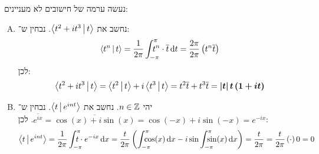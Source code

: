 \documentclass[]{../../../../tex/classes/homework}
\begin{document}
	\section{}
	נעשה ערמה של חישובים לא מעניינים: 
	\begin{enumerate}[(A)]
		\item נחשב את $\left \langle t^{2} + it^{3} \,\middle|\, t \right \rangle$. 
		נבחין ש־: 
		\[ \left \langle t^{n} \,\middle|\, t \right \rangle = \frac{1}{2\pi}\int^{\pi}_{-\pi}\!\!\!\!\!\! t^{n} \cdot\overline{t}\,\mathrm{d}t = \frac{2\pi}{2\pi}\left ( t^{n}\overline{t} \right ) \]
		לכן: 
		\[ \left \langle t^{2} + it^{3} \,\middle|\, t \right \rangle = \left \langle t^{2} \,\middle|\, t \right \rangle + i\left \langle t^{3} \,\middle|\, t \right \rangle = t^{2}\overline{t} + t^{3}\overline{t} = \bm{\left \lvert t \right \rvert t\left ( 1 + it \right )} \]
		\item יהי $n \in \mathbb{Z}$. נחשב את $\left \langle t \,\middle|\, e^{int} \right \rangle$. נבחין ש־$\overline{e^{ix}} = \overline{\cos(x) + i\sin(x)} = \cos(-x) + i\sin(-x) = e^{-ix}$. לכן: 
		\[ \mut{t}{e^{int}} = \frac{1}{2\pi}\int^{\pi}_{-\pi}\dequad t \cdot e^{-ix}\dx = \frac{t}{2\pi}\cl{\int^{\pi}_{-\pi}\dequad \cos(x)\dx - i \sin \int^{\pi}_{-\pi}\dequad \sin(x)\dx} = \frac{t}{2\pi} = \frac{t}{2\pi}\cl \cdot 0 = 0 \]
	\end{enumerate}
	
\end{document}
